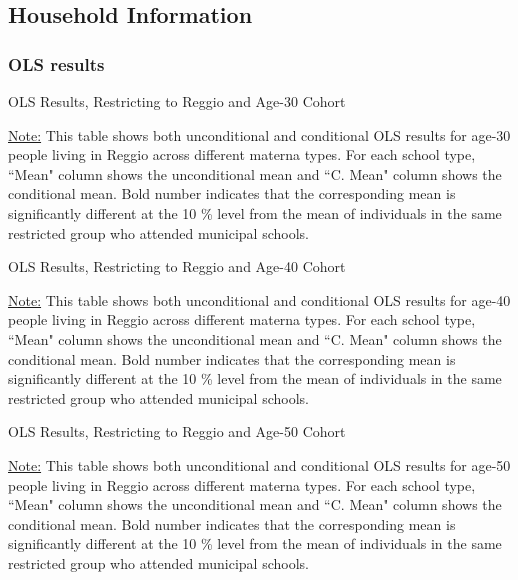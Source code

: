 \documentclass[11pt]{article}
\begin{document}
\subsection{Household Information}

\subsubsection{OLS results}
\begin{table}[H]
\begin{center}
	\caption{OLS Results, Restricting to Reggio and Age-30 Cohort} \label{table:OLS-R30-L}
	\scalebox{0.76}{
		
	}
	\end{center}
	\footnotesize
\underline{Note:} This table shows both unconditional and conditional OLS results for age-30 people living in Reggio across different materna types. For each school type, ``Mean" column shows the unconditional mean and ``C. Mean" column shows the conditional mean. Bold number indicates that the corresponding mean is significantly different at the 10 \% level from the mean of individuals in the same restricted group who attended municipal schools.

\end{table}

\begin{table}[H]
\begin{center}
	\caption{OLS Results, Restricting to Reggio and Age-40 Cohort} \label{table:OLS-R40-L}
	\scalebox{0.76}{
		
	}
	\end{center}
	\footnotesize
\underline{Note:} This table shows both unconditional and conditional OLS results for age-40 people living in Reggio across different materna types. For each school type, ``Mean" column shows the unconditional mean and ``C. Mean" column shows the conditional mean. Bold number indicates that the corresponding mean is significantly different at the 10 \% level from the mean of individuals in the same restricted group who attended municipal schools.

\end{table}

\begin{table}[H]
\begin{center}
	\caption{OLS Results, Restricting to Reggio and Age-50 Cohort} \label{table:OLS-R50-L}
	\scalebox{0.76}{
		
	}
	\end{center}
	\footnotesize
\underline{Note:} This table shows both unconditional and conditional OLS results for age-50 people living in Reggio across different materna types. For each school type, ``Mean" column shows the unconditional mean and ``C. Mean" column shows the conditional mean. Bold number indicates that the corresponding mean is significantly different at the 10 \% level from the mean of individuals in the same restricted group who attended municipal schools.

\end{table}
\end{document}
